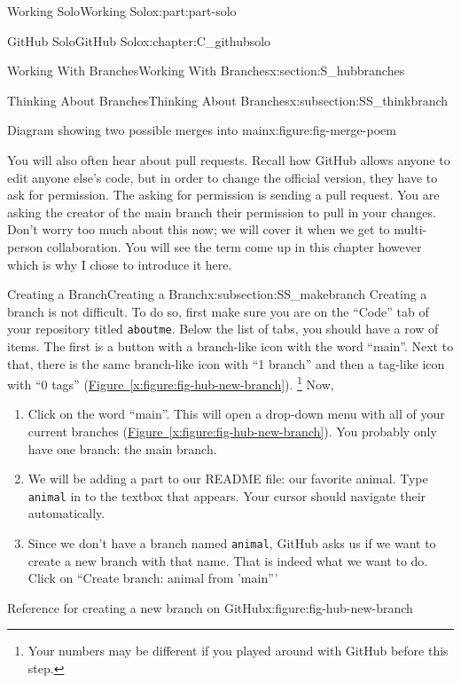 \documentclass[oneside,10pt,]{book}
\newcommand{\xreffont}{\relax}
\newcommand{\mono}[1]{\texttt{#1}}
\begin{document}
\begin{partptx}{Working Solo}{}{Working Solo}{}{}{x:part:part-solo}
\begin{chapterptx}{GitHub Solo}{}{GitHub Solo}{}{}{x:chapter:C_githubsolo}
\begin{sectionptx}{Working With Branches}{}{Working With Branches}{}{}{x:section:S_hubbranches}
\begin{subsectionptx}{Thinking About Branches}{}{Thinking About Branches}{}{}{x:subsection:SS_thinkbranch}
\begin{figureptx}{Diagram showing two possible merges into main}{x:figure:fig-merge-poem}{}
\begin{image}{0.05}{0.9}{0.05}
\end{image}%
\tcblower
\end{figureptx}%
You will also often hear about pull requests. Recall how GitHub allows anyone to edit anyone else's code, but in order to change the official version, they have to ask for permission. The asking for permission is sending a pull request. You are asking the creator of the main branch their permission to pull in your changes. Don't worry too much about this now; we will cover it when we get to multi-person collaboration. You will see the term come up in this chapter however which is why I chose to introduce it here.%
\end{subsectionptx}
%
%
\typeout{************************************************}
\typeout{************************************************}
%
\begin{subsectionptx}{Creating a Branch}{}{Creating a Branch}{}{}{x:subsection:SS_makebranch}
%
%
Creating a branch is not difficult. To do so, first make sure you are on the ``Code'' tab of your repository titled \mono{aboutme}. Below the list of tabs, you should have a row of items. The first is a button with a branch-like icon with the word ``main''. Next to that, there is the same branch-like icon with ``1 branch'' and then a tag-like icon with ``0 tags'' (\hyperref[x:figure:fig-hub-new-branch]{Figure~{\xreffont\ref{x:figure:fig-hub-new-branch}}}). \footnote{Your numbers may be different if you played around with GitHub before this step.\label{g:fn:idp616037896}} Now,%
\begin{enumerate}
\item{}Click on the word ``main''. This will open a drop-down menu with all of your current branches (\hyperref[x:figure:fig-hub-new-branch]{Figure~{\xreffont\ref{x:figure:fig-hub-new-branch}}}). You probably only have one branch: the main branch.%
\item{}We will be adding a part to our README file: our favorite animal. Type \mono{animal} in to the textbox that appears. Your cursor should navigate their automatically.%
\item{}Since we don't have a branch named \mono{animal}, GitHub asks us if we want to create a new branch with that name. That is indeed what we want to do. Click on ``Create branch: animal from 'main'''%
\end{enumerate}
%
\begin{figureptx}{Reference for creating a new branch on GitHub}{x:figure:fig-hub-new-branch}{}%

\end{figureptx}
\end{subsectionptx}
\end{sectionptx}
\end{chapterptx}
\end{partptx}
\end{document}
